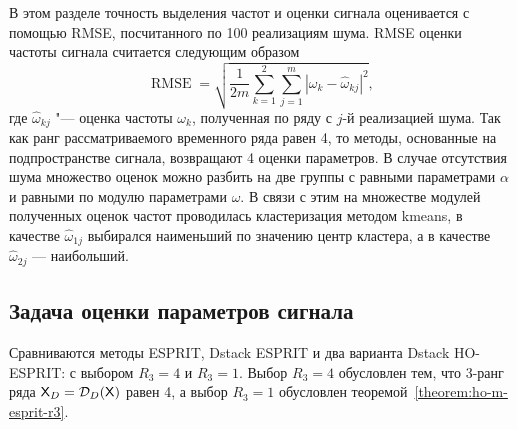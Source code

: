 \documentclass[specialist,
  substylefile=spbu_report.rtx,
subf,href,colorlinks=true, 12pt]{disser}
\theoremstyle{plain}
\theoremstyle{definition}
\theoremstyle{remark}
\begin{document}
В этом разделе точность выделения частот и оценки сигнала
оценивается с помощью RMSE, посчитанного по 100 реализациям шума.
RMSE оценки частоты сигнала считается следующим образом
\begin{equation}
  \label{eq:rmse-estim}
  \operatorname{RMSE} =\sqrt{\frac{1}{2m}
    \sum_{k=1}^{2}\sum_{j=1}^{m}
  \left|\omega_{k}-\widehat{\omega}_{kj}\right|^2},
\end{equation}
где $\widehat{\omega}_{kj}$ "--- оценка частоты $\omega_k$, полученная по ряду
с $j$-й реализацией шума.
Так как ранг рассматриваемого временного ряда равен 4, то методы,
основанные на подпространстве сигнала, возвращают 4 оценки параметров.
В случае отсутствия шума множество оценок можно разбить на две группы с равными
параметрами $\alpha$ и равными по модулю параметрами $\omega$.
В связи с этим на множестве модулей полученных оценок частот
проводилась кластеризация методом kmeans, в качестве
$\widehat{\omega}_{1j}$ выбирался наименьший по значению центр
кластера, а в качестве
$\widehat{\omega}_{2j}$ --- наибольший.

\subsection{Задача оценки параметров сигнала}\label{subsec:dstack-esprit}
Сравниваются методы ESPRIT, Dstack ESPRIT и два варианта Dstack
HO-ESPRIT: с выбором $R_3=4$ и $R_3=1$.
Выбор $R_3=4$ обусловлен тем, что 3-ранг ряда
$\mathsf{X}_D=\mathcal{D}_D(\mathsf{X})$ равен 4, а выбор $R_3=1$ обусловлен
теоремой~\ref{theorem:ho-m-esprit-r3}.
\end{document}
